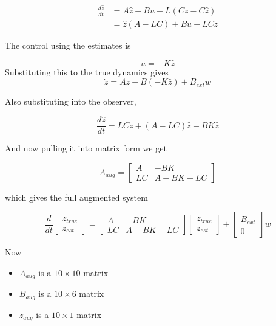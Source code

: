 \documentclass[12pt,A4, onecolumn]{exam}
\begin{document}
\begin{questions}
\begin{solution}
\begin{parts}
    \begin{align*}
      \frac{ d\hat{z} }{ dt } &= A\hat{z} + Bu + L \left( Cz - C\hat{z} \right)\\
      &= \hat{z} \left( A-LC \right) + Bu + LCz
    \end{align*}

    The control using the estimates is 
    
    \[
        u = -K \hat{z}
    \]
    Substituting this to the true dynamics gives 
    \[
        \dot{z} = Az + B \left( -K\hat{z} \right) + B_{ext} w
    \]

    Also substituting into the observer,

    \[
        \frac{ d\hat{z} }{ dt } = LCz + \left( A-LC \right) \hat{z} -BK\hat{z}
    \]
    
    And now pulling it into matrix form we get 

    \[
        A_{aug} = \begin{bmatrix}
            A&-B K\\
            LC&A-BK-LC
        \end{bmatrix} 
    \]

    which gives the full augmented system

    \[
        \frac{ d }{ dt } \begin{bmatrix}
            z_{true} \\
            z_{est}
        \end{bmatrix} = \begin{bmatrix}
            A & -BK \\
            LC & A - BK - LC
        \end{bmatrix} \begin{bmatrix}
            z_{true} \\
            z_{est} 
        \end{bmatrix} + \begin{bmatrix}
            B_{ext} \\
            0
        \end{bmatrix} w
    \]
    
    
    Now \begin{itemize}
      \item $ A_{aug} $ is a $ 10\times 10 $ matrix
      \item $ B_{aug} $ is a $ 10 \times 6 $ matrix
      \item $ z_{aug} $ is a $ 10 \times 1 $ matrix    
    \end{itemize}  


\end{parts}
\end{solution}
\end{questions}
\end{document}
